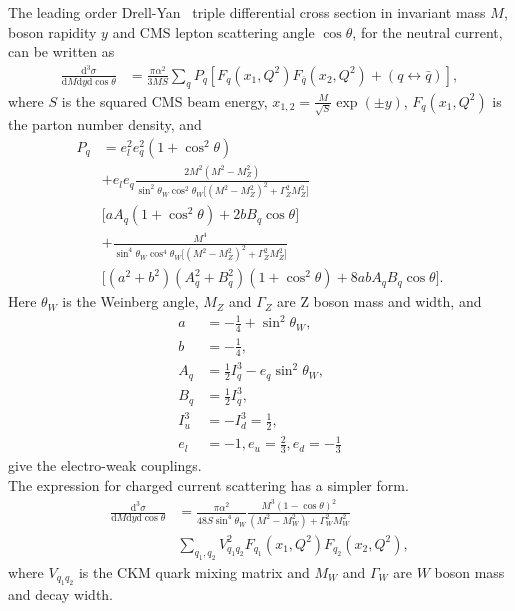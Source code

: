 The leading order Drell-Yan~\cite{Drell:1970wh,Yamada:1981mw} 
triple differential cross section in
invariant mass \(M\), boson rapidity \(y\) and CMS
lepton scattering angle \(\cos\theta\),
for the neutral current, 
can be written as
\begin{align}
 \frac{\mathrm{d}^3\sigma}{\mathrm{d}M\mathrm{d}y\mathrm{d}\cos\theta} &= 
   \frac{\pi\alpha^2}{3MS}\sum_{q}P_q
   \left[F_q(x_1,Q^2)F_{\bar{q}}(x_2,Q^2) + (q\leftrightarrow\bar{q})\right],
\end{align}
where \(S\) is the squared CMS beam energy, \(x_{1,2} = \frac{M}{\sqrt{S}}\exp(\pm y)\), $F_q(x_1,Q^2)$ 
is the parton number density, and 
\begin{align}
  P_q &=  e_l^2e_q^2(1+\cos^2\theta) \nonumber \\
      &+  e_le_q\frac{2M^2(M^2-M_Z^2)}{\sin^2\theta_W\cos^2\theta_W
          \big[(M^2-M_Z^2)^2+\Gamma_Z^2M_Z^2\big]} \nonumber \\
      &    \big[aA_q(1+\cos^2\theta)+2bB_q\cos\theta\big] \nonumber \\
      &+  \frac{M^4}{\sin^4\theta_W\cos^4\theta_W
          \big[(M^2-M_Z^2)^2+\Gamma_Z^2M_Z^2\big]} \nonumber \\
      &    \big[(a^2+b^2)(A_q^2+B_q^2)(1+\cos^2\theta)+8abA_qB_q\cos\theta\big].
\end{align}
Here \(\theta_W\) is the Weinberg angle, \(M_Z\) and \(\Gamma_Z\) are Z boson mass and 
width, and
\begin{align}
 a & = -\frac{1}{4} + \sin^2\theta_W,  \nonumber \\
 b & = -\frac{1}{4},  \nonumber \\
 A_q & = \frac{1}{2}I_q^3-e_q\sin^2\theta_W, \nonumber \\
 B_q & = \frac{1}{2}I_q^3,  \nonumber \\
 I_u^3 & = -I_d^3 = \frac{1}{2},  \nonumber \\
 e_l & = -1, e_u = \frac{2}{3}, e_d = -\frac{1}{3}
\end{align}
give the electro-weak couplings.
\\
The expression for charged current scattering has a simpler form.
\begin{align}
\frac{\mathrm{d}^3\sigma}{\mathrm{d}M\mathrm{d}y\mathrm{d}\cos\theta} &=
 \frac{\pi\alpha^2}{48S\sin^4\theta_W}
 \frac{M^3(1-\cos\theta)^2}{(M^2-M_W^2)+\Gamma_W^2M_W^2}  \nonumber \\
 & \sum_{q_1,q_2}V_{q_1q_2}^2F_{q_1}(x_1,Q^2)F_{q_2}(x_2,Q^2),
\end{align}
where \(V_{q_1q_2}\) is the CKM quark mixing matrix and \(M_W\) and \(\Gamma_W\)
are \(W\) boson mass and decay width.

